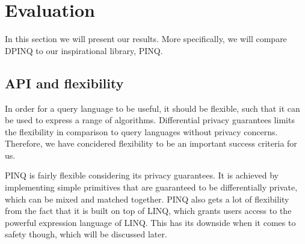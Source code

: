 \documentclass[12pt]{article}
\begin{document}
\section{Evaluation}\label{sec:evaluation}

In this section we will present our results.
More specifically, we will compare DPINQ to our inspirational library, PINQ.

\subsection{API and flexibility}

In order for a query language to be useful, it should be flexible, such that it can be used to express a range of algorithms.
Differential privacy guarantees limits the flexibility in comparison to query languages without privacy concerns.
Therefore, we have concidered flexibility to be an important success criteria for us.

PINQ is fairly flexible considering its privacy guarantees.
It is achieved by implementing simple primitives that are guaranteed to be differentially private, which can be mixed and matched together.
PINQ also gets a lot of flexibility from the fact that it is built on top of LINQ, which grants users access to the powerful expression language of LINQ.
This has its downside when it comes to safety though, which will be discussed later.
\end{document}
